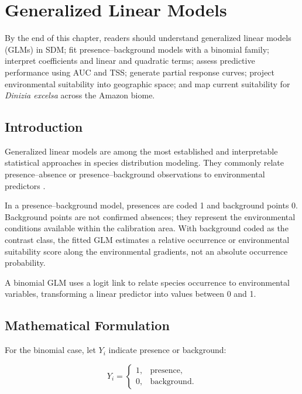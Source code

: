 \chapter[GLM]{Generalized Linear Models}

\begin{objetivos}
By the end of this chapter, readers should understand generalized linear models
(GLMs) in SDM; fit presence--background models with a binomial family;
interpret coefficients and linear and quadratic terms; assess predictive
performance using AUC and TSS; generate partial response curves; project
environmental suitability into geographic space; and map current suitability
for \textit{Dinizia excelsa} across the Amazon biome.
\end{objetivos}

\section{Introduction}

Generalized linear models are among the most established and interpretable
statistical approaches in species distribution modeling. They commonly relate
presence--absence or presence--background observations to environmental
predictors \parencite{guisan2000,guisan2005predicting,guisan2017habitat}.

In a presence--background model, presences are coded 1 and background points 0.
Background points are not confirmed absences; they represent the environmental
conditions available within the calibration area. With background coded as the
contrast class, the fitted GLM estimates a relative occurrence or environmental
suitability score along the environmental gradients, not an absolute occurrence
probability.

\begin{conceito}[title={\faBook\quad GLMs in SDM}]
A binomial GLM uses a logit link to relate species occurrence to environmental
variables, transforming a linear predictor into values between 0 and 1.
\end{conceito}

\section{Mathematical Formulation}

For the binomial case, let $Y_i$ indicate presence or background:

\[
Y_i =
\begin{cases}
  1, & \text{presence},\\
  0, & \text{background}.
\end{cases}
\]

